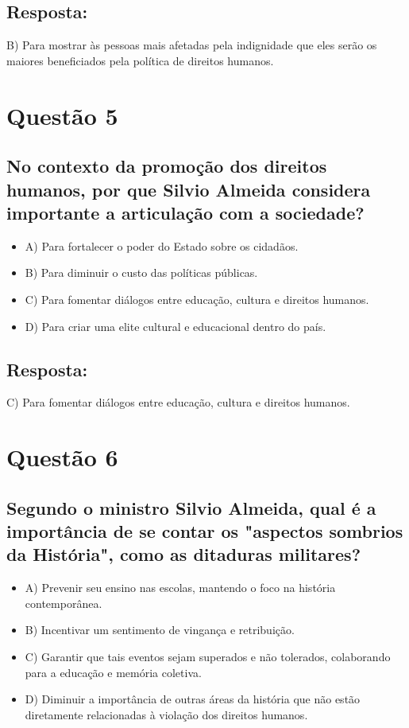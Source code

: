 \documentclass[
   article,       
   12pt,          
   oneside,       
   a4paper,       
   english,       
   brazil,        
   sumario=tradicional
   ]{abntex2}
\begin{document}
\subsection{Resposta:}
B) Para mostrar às pessoas mais afetadas pela indignidade que eles serão os maiores beneficiados pela política de direitos humanos.


\section{Questão 5}
\subsection*{No contexto da promoção dos direitos humanos, por que Silvio Almeida considera importante a articulação com a sociedade?}
\begin{itemize}
    \item A) Para fortalecer o poder do Estado sobre os cidadãos.
    \item B) Para diminuir o custo das políticas públicas.
    \item C) Para fomentar diálogos entre educação, cultura e direitos humanos.
    \item D) Para criar uma elite cultural e educacional dentro do país.
\end{itemize}
\subsection{Resposta:}
C) Para fomentar diálogos entre educação, cultura e direitos humanos.


\section{Questão 6}
\subsection*{Segundo o ministro Silvio Almeida, qual é a importância de se contar os "aspectos sombrios da História", como as ditaduras militares?}
\begin{itemize}
    \item A) Prevenir seu ensino nas escolas, mantendo o foco na história contemporânea.
    \item B) Incentivar um sentimento de vingança e retribuição.
    \item C) Garantir que tais eventos sejam superados e não tolerados, colaborando para a educação e memória coletiva.
    \item D) Diminuir a importância de outras áreas da história que não estão diretamente relacionadas à violação dos direitos humanos.
\end{itemize}
\end{document}
